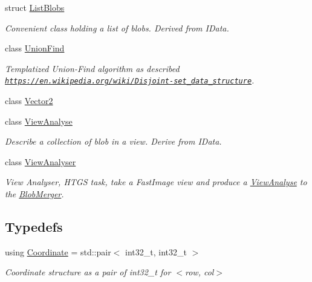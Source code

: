 \begin{DoxyCompactItemize}
struct \hyperlink{structfc_1_1ListBlobs}{List\+Blobs}
\begin{DoxyCompactList}\small\item\em Convenient class holding a list of blobs. Derived from I\+Data. \end{DoxyCompactList}\item 
class \hyperlink{classfc_1_1UnionFind}{Union\+Find}
\begin{DoxyCompactList}\small\item\em Templatized Union-\/\+Find algorithm as described \href{https://en.wikipedia.org/wiki/Disjoint-set_data_structure}{\tt https\+://en.\+wikipedia.\+org/wiki/\+Disjoint-\/set\+\_\+data\+\_\+structure}. \end{DoxyCompactList}\item 
class \hyperlink{classfc_1_1Vector2}{Vector2}
\item 
class \hyperlink{classfc_1_1ViewAnalyse}{View\+Analyse}
\begin{DoxyCompactList}\small\item\em Describe a collection of blob in a view. Derive from I\+Data. \end{DoxyCompactList}\item 
class \hyperlink{classfc_1_1ViewAnalyser}{View\+Analyser}
\begin{DoxyCompactList}\small\item\em View Analyser, H\+T\+GS task, take a Fast\+Image view and produce a \hyperlink{classfc_1_1ViewAnalyse}{View\+Analyse} to the \hyperlink{classfc_1_1BlobMerger}{Blob\+Merger}. \end{DoxyCompactList}\end{DoxyCompactItemize}
\subsection*{Typedefs}
\begin{DoxyCompactItemize}
\item 
using \hyperlink{namespacefc_a7da125cb1e99553c27c07139ee8a62ca}{Coordinate} = std\+::pair$<$ int32\+\_\+t, int32\+\_\+t $>$
\begin{DoxyCompactList}\small\item\em Coordinate structure as a pair of int32\+\_\+t for $<$row, col$>$ \end{DoxyCompactList}\end{DoxyCompactItemize}
